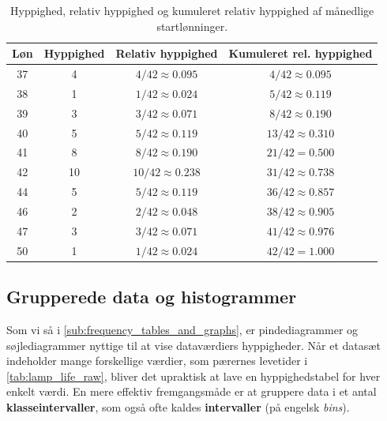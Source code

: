 \begin{table}[htbp]
\centering
\renewcommand{\arraystretch}{1.3}
{
\begin{tabular}{cccc}
\toprule
\textbf{Løn} & \textbf{Hyppighed} & \textbf{Relativ hyppighed} & \textbf{Kumuleret rel. hyppighed} \\
\midrule
37 & 4 & $4/42 \approx 0.095$ & $4/42 \approx 0.095$ \\
38 & 1 & $1/42 \approx 0.024$ & $5/42 \approx 0.119$ \\
39 & 3 & $3/42 \approx 0.071$ & $8/42 \approx 0.190$ \\
40 & 5 & $5/42 \approx 0.119$ & $13/42 \approx 0.310$ \\
41 & 8 & $8/42 \approx 0.190$ & $21/42 = 0.500$ \\
42 & 10 & $10/42 \approx 0.238$ & $31/42 \approx 0.738$ \\
44 & 5 & $5/42 \approx 0.119$ & $36/42 \approx 0.857$ \\
46 & 2 & $2/42 \approx 0.048$ & $38/42 \approx 0.905$ \\
47 & 3 & $3/42 \approx 0.071$ & $41/42 \approx 0.976$ \\
50 & 1 & $1/42 \approx 0.024$ & $42/42 = 1.000$ \\
\bottomrule
\end{tabular}
}
\caption{Hyppighed, relativ hyppighed og kumuleret relativ hyppighed af månedlige startlønninger.}
\label{tab:salary_full_freq}
\end{table}

\newpage

\subsection*{Grupperede data og histogrammer}

Som vi så i \autoref{sub:frequency_tables_and_graphs}, er pindediagrammer og søjlediagrammer nyttige til at vise dataværdiers hyppigheder. Når et datasæt indeholder mange forskellige værdier, som pærernes levetider i \autoref{tab:lamp_life_raw}, bliver det upraktisk at lave en hyppighedstabel for hver enkelt værdi. En mere effektiv fremgangsmåde er at gruppere data i et antal \textbf{klasseintervaller}, som også ofte kaldes \textbf{intervaller} (på engelsk \emph{bins}).

